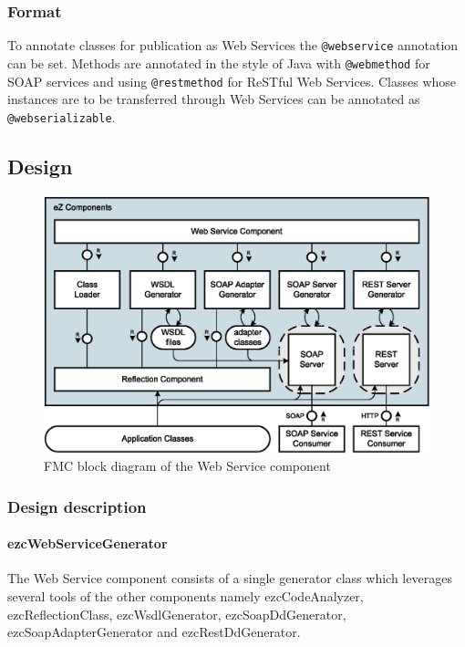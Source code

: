\documentclass[10pt,final,a4paper,oneside]{article}
\begin{document}
\subsubsection{Format}
To annotate classes for publication as Web Services
the \verb|@webservice| annotation can be set.
Methods are annotated in the style of Java
with \verb|@webmethod| for SOAP services
and using \verb|@restmethod| for ReSTful Web Services.
Classes whose instances are to be transferred
through Web Services can be annotated as \verb|@webserializable|.


\subsection{Design}\label{subsec:WebServiceDesign}
%
%

\begin{figure}[htbp]
	\centering
		\includegraphics[width=1.00\textwidth]{figures/ezcWebService.block-diagram.eps}
	\caption{FMC block diagram of the Web Service component}
	\label{fig:ezcWebService.block-diagram}
\end{figure}

\subsubsection{Design description}

\paragraph{ezcWebServiceGenerator}
The Web Service component consists of a single generator class
which leverages several tools of the other components namely
ezcCodeAnalyzer, ezcReflectionClass, ezcWsdlGenerator, ezcSoapDdGenerator,
ezcSoapAdapterGenerator and ezcRestDdGenerator.
\end{document}
